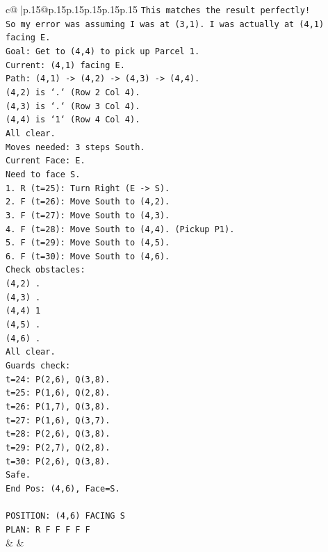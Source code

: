 \documentclass{article}
\begin{document}
{\begin{supertabular}{c@{$\;$}|p{.15\linewidth}@{}p{.15\linewidth}p{.15\linewidth}p{.15\linewidth}p{.15\linewidth}p{.15\linewidth}}
{{{\texttt{This matches the result perfectly!} \\
\texttt{So my error was assuming I was at (3,1). I was actually at (4,1) facing E.} \\
\texttt{Goal: Get to (4,4) to pick up Parcel 1.} \\
\texttt{Current: (4,1) facing E.} \\
\texttt{Path: (4,1) {-}> (4,2) {-}> (4,3) {-}> (4,4).} \\
\texttt{(4,2) is `.` (Row 2 Col 4).} \\
\texttt{(4,3) is `.` (Row 3 Col 4).} \\
\texttt{(4,4) is `1` (Row 4 Col 4).} \\
\texttt{All clear.} \\
\texttt{Moves needed: 3 steps South.} \\
\texttt{Current Face: E.} \\
\texttt{Need to face S.} \\
\texttt{1. R (t=25): Turn Right (E {-}> S).} \\
\texttt{2. F (t=26): Move South to (4,2).} \\
\texttt{3. F (t=27): Move South to (4,3).} \\
\texttt{4. F (t=28): Move South to (4,4). (Pickup P1).} \\
\texttt{5. F (t=29): Move South to (4,5).} \\
\texttt{6. F (t=30): Move South to (4,6).} \\
\texttt{Check obstacles:} \\
\texttt{(4,2) .} \\
\texttt{(4,3) .} \\
\texttt{(4,4) 1} \\
\texttt{(4,5) .} \\
\texttt{(4,6) .} \\
\texttt{All clear.} \\
\texttt{Guards check:} \\
\texttt{t=24: P(2,6), Q(3,8).} \\
\texttt{t=25: P(1,6), Q(2,8).} \\
\texttt{t=26: P(1,7), Q(3,8).} \\
\texttt{t=27: P(1,6), Q(3,7).} \\
\texttt{t=28: P(2,6), Q(3,8).} \\
\texttt{t=29: P(2,7), Q(2,8).} \\
\texttt{t=30: P(2,6), Q(3,8).} \\
\texttt{Safe.} \\
\texttt{End Pos: (4,6), Face=S.} \\
\\ 
\texttt{POSITION: (4,6) FACING S} \\
\texttt{PLAN: R F F F F F} \\
            }
        }
    }
    & & \\ \\


\end{supertabular}}
\end{document}
